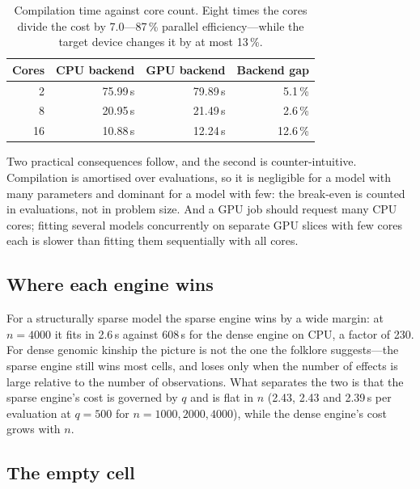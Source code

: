 \documentclass[article]{jss}
\begin{document}
\begin{table}[h]\centering
\begin{tabular}{rrrr}
\toprule
Cores & CPU backend & GPU backend & Backend gap \\
\midrule
 2 & \phantom{0}75.99\,s & \phantom{0}79.89\,s & 5.1\,\% \\
 8 & \phantom{0}20.95\,s & \phantom{0}21.49\,s & 2.6\,\% \\
16 & \phantom{0}10.88\,s & \phantom{0}12.24\,s & 12.6\,\% \\
\bottomrule
\end{tabular}
\caption{\label{tab:compil}Compilation time against core count. Eight times
the cores divide the cost by 7.0---87\,\% parallel efficiency---while the
target device changes it by at most 13\,\%.}
\end{table}

Two practical consequences follow, and the second is counter-intuitive.
Compilation is amortised over evaluations, so it is negligible for a model
with many parameters and dominant for a model with few: the break-even is
counted in evaluations, not in problem size. And a GPU job should request many
CPU cores; fitting several models concurrently on separate GPU slices with few
cores each is slower than fitting them sequentially with all cores.

\subsection{Where each engine wins}


For a structurally sparse model the sparse engine wins by a wide margin: at
$n = 4000$ it fits in 2.6\,s against 608\,s for the dense engine on CPU, a
factor of 230. For dense genomic kinship the picture is not the one the
folklore suggests---the sparse engine still wins most cells, and loses only
when the number of effects is large relative to the number of observations.
What separates the two is that the sparse engine's cost is governed by $q$ and
is flat in $n$ (2.43, 2.43 and 2.39\,s per evaluation at $q = 500$ for
$n = 1000, 2000, 4000$), while the dense engine's cost grows with $n$.

\subsection{The empty cell}
\end{document}
